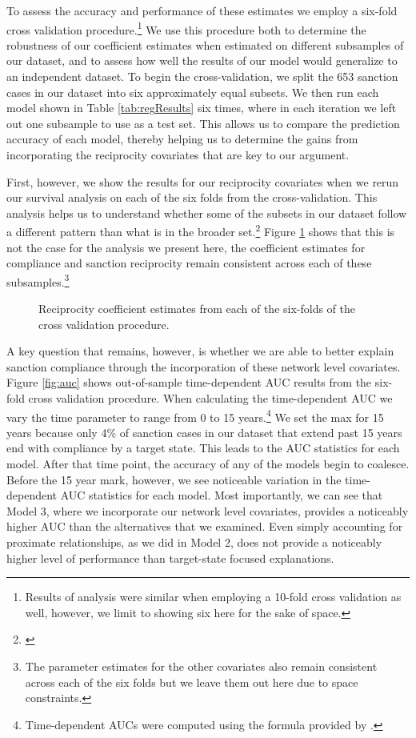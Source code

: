 To assess the accuracy and performance of these estimates we employ a six-fold cross validation procedure.\footnote{Results of analysis were similar when employing a 10-fold cross validation as well, however, we limit to showing six here for the sake of space.} We use this procedure both to determine the robustness of our coefficient estimates when estimated on different subsamples of our dataset, and to assess how well the results of our model would generalize to an independent dataset. To begin the cross-validation, we split the 653 sanction cases in our dataset into six approximately equal subsets. We then run each model shown in Table \ref{tab:regResults} six times, where in each iteration we left out one subsample to use as a test set. This allows us to compare the prediction accuracy of each model, thereby helping us to determine the gains from incorporating the reciprocity covariates that are key to our argument.

First, however, we show the results for our reciprocity covariates when we rerun our survival analysis on each of the six folds from the cross-validation. This analysis helps us to understand whether some of the subsets in our dataset follow a different pattern than what is in the broader set.\footnote{\cite{beck2008time}} Figure \ref{fig:crossval} shows that this is not the case for the analysis we present here, the coefficient estimates for compliance and sanction reciprocity remain consistent across each of these subsamples.\footnote{The parameter estimates for the other covariates also remain consistent across each of the six folds but we leave them out here due to space constraints.}


\begin{figure}[ht]
	\centering
	\caption{Reciprocity coefficient estimates from each of the six-folds of the cross validation procedure.}
	\resizebox{1\textwidth}{!}{}
	\label{fig:crossval}
\end{figure}


A key question that remains, however, is whether we are able to better explain sanction compliance through the incorporation of these network level covariates. Figure \ref{fig:auc} shows out-of-sample time-dependent AUC results from the six-fold cross validation procedure. When calculating the time-dependent AUC we vary the time parameter to range from 0 to 15 years.\footnote{Time-dependent AUCs were computed using the formula provided by \citet{chambless2006estimation}.} We set the max for 15 years because only 4\% of sanction cases in our dataset that extend past 15 years end with compliance by a target state. This leads to the AUC statistics for each model. After that time point, the accuracy of any of the models begin to coalesce. Before the 15 year mark, however, we see noticeable variation in the time-dependent AUC statistics for each model. Most importantly, we can see that Model 3, where we incorporate our network level covariates, provides a noticeably higher AUC than the alternatives that we examined. Even simply accounting for proximate relationships, as we did in Model 2, does not provide a noticeably higher level of performance than target-state focused explanations.


